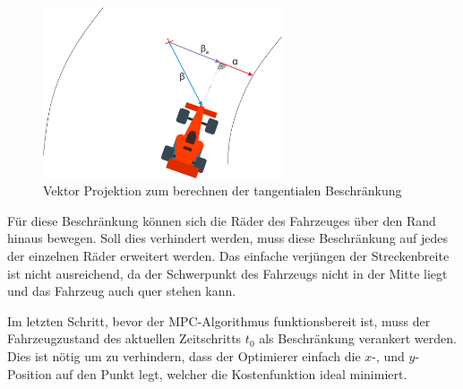 \documentclass{like}
\begin{document}
\begin{figure}[ht!]
	\centering
	\includegraphics[width=200pt]{Abbildungen/vektorProjection.png}
	\caption{Vektor Projektion zum berechnen der tangentialen Beschränkung}
	\label{fig:vektorProjektion}
\end{figure}

Für diese Beschränkung können sich die Räder des Fahrzeuges über den Rand hinaus bewegen. Soll dies verhindert werden, muss diese Beschränkung auf jedes der einzelnen Räder erweitert werden. Das einfache verjüngen der Streckenbreite ist nicht ausreichend, da der Schwerpunkt des Fahrzeugs nicht in der Mitte liegt und das Fahrzeug auch quer stehen kann.

Im letzten Schritt, bevor der \ac{MPC}-Algorithmus funktionsbereit ist, muss der Fahrzeugzustand des aktuellen Zeitschritts $t_0$ als Beschränkung verankert werden.  Dies ist nötig um zu verhindern, dass der Optimierer einfach die \(x\)-, und \(y\)-Position auf den Punkt legt, welcher die Kostenfunktion ideal minimiert. 
\end{document}
